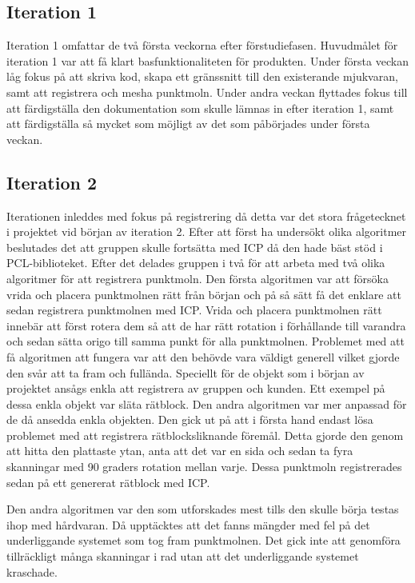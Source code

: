 \subsection{Iteration 1}

Iteration 1 omfattar de två första veckorna efter förstudiefasen. Huvudmålet för iteration 1 var att få klart basfunktionaliteten för produkten. Under första veckan låg fokus på att skriva kod, skapa ett gränssnitt till den existerande mjukvaran, samt att registrera och mesha punktmoln. Under andra veckan flyttades fokus till att färdigställa den dokumentation som skulle lämnas in efter iteration 1, samt att färdigställa så mycket som möjligt av det som påbörjades under första veckan.

\subsection{Iteration 2}

Iterationen inleddes med fokus på registrering då detta var det stora frågetecknet i projektet vid början av iteration 2. Efter att först ha undersökt olika algoritmer beslutades det att gruppen skulle fortsätta med ICP då den hade bäst stöd i PCL-biblioteket. Efter det delades gruppen i två för att arbeta med två olika algoritmer för att registrera punktmoln. Den första algoritmen var att försöka vrida och placera punktmolnen rätt från början och på så sätt få det enklare att sedan registrera punktmolnen med ICP. Vrida och placera punktmolnen rätt innebär att först rotera dem så att de har rätt rotation i förhållande till varandra och sedan sätta origo till samma punkt för alla punktmolnen. Problemet med att få algoritmen att fungera var att den behövde vara väldigt generell vilket gjorde den svår att ta fram och fullända. Speciellt för de objekt som i början av projektet ansågs enkla att registrera av gruppen och kunden. Ett exempel på dessa enkla objekt var släta rätblock. Den andra algoritmen var mer anpassad för de då ansedda enkla objekten. Den gick ut på att i första hand endast lösa problemet med att registrera rätblocksliknande föremål. Detta gjorde den genom att hitta den plattaste ytan, anta att det var en sida och sedan ta fyra skanningar med 90 graders rotation mellan varje. Dessa punktmoln registrerades sedan på ett genererat rätblock med ICP.

Den andra algoritmen var den som utforskades mest tills den skulle börja testas ihop med hårdvaran. Då upptäcktes att det fanns mängder med fel på det underliggande systemet som tog fram punktmolnen. Det gick inte att genomföra tillräckligt många skanningar i rad utan att det underliggande systemet kraschade.

